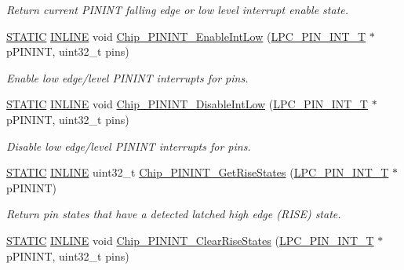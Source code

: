 \begin{DoxyCompactItemize}
\begin{DoxyCompactList}\small\item\em Return current P\+I\+N\+I\+NT falling edge or low level interrupt enable state. \end{DoxyCompactList}\item 
\hyperlink{group___l_p_c___types___public___macros_ga10b2d890d871e1489bb02b7e70d9bdfb}{S\+T\+A\+T\+IC} \hyperlink{spifi__18xx__43xx_8h_a2eb6f9e0395b47b8d5e3eeae4fe0c116}{I\+N\+L\+I\+NE} void \hyperlink{group___p_i_n_i_n_t__18_x_x__43_x_x_ga314265e0674903dee85767e974b77b7d}{Chip\+\_\+\+P\+I\+N\+I\+N\+T\+\_\+\+Enable\+Int\+Low} (\hyperlink{struct_l_p_c___p_i_n___i_n_t___t}{L\+P\+C\+\_\+\+P\+I\+N\+\_\+\+I\+N\+T\+\_\+T} $\ast$p\+P\+I\+N\+I\+NT, uint32\+\_\+t pins)
\begin{DoxyCompactList}\small\item\em Enable low edge/level P\+I\+N\+I\+NT interrupts for pins. \end{DoxyCompactList}\item 
\hyperlink{group___l_p_c___types___public___macros_ga10b2d890d871e1489bb02b7e70d9bdfb}{S\+T\+A\+T\+IC} \hyperlink{spifi__18xx__43xx_8h_a2eb6f9e0395b47b8d5e3eeae4fe0c116}{I\+N\+L\+I\+NE} void \hyperlink{group___p_i_n_i_n_t__18_x_x__43_x_x_gaaf5ace298255f4720f545b39c1053389}{Chip\+\_\+\+P\+I\+N\+I\+N\+T\+\_\+\+Disable\+Int\+Low} (\hyperlink{struct_l_p_c___p_i_n___i_n_t___t}{L\+P\+C\+\_\+\+P\+I\+N\+\_\+\+I\+N\+T\+\_\+T} $\ast$p\+P\+I\+N\+I\+NT, uint32\+\_\+t pins)
\begin{DoxyCompactList}\small\item\em Disable low edge/level P\+I\+N\+I\+NT interrupts for pins. \end{DoxyCompactList}\item 
\hyperlink{group___l_p_c___types___public___macros_ga10b2d890d871e1489bb02b7e70d9bdfb}{S\+T\+A\+T\+IC} \hyperlink{spifi__18xx__43xx_8h_a2eb6f9e0395b47b8d5e3eeae4fe0c116}{I\+N\+L\+I\+NE} uint32\+\_\+t \hyperlink{group___p_i_n_i_n_t__18_x_x__43_x_x_ga41e14d3b9450d31efea7c1c35081426b}{Chip\+\_\+\+P\+I\+N\+I\+N\+T\+\_\+\+Get\+Rise\+States} (\hyperlink{struct_l_p_c___p_i_n___i_n_t___t}{L\+P\+C\+\_\+\+P\+I\+N\+\_\+\+I\+N\+T\+\_\+T} $\ast$p\+P\+I\+N\+I\+NT)
\begin{DoxyCompactList}\small\item\em Return pin states that have a detected latched high edge (R\+I\+SE) state. \end{DoxyCompactList}\item 
\hyperlink{group___l_p_c___types___public___macros_ga10b2d890d871e1489bb02b7e70d9bdfb}{S\+T\+A\+T\+IC} \hyperlink{spifi__18xx__43xx_8h_a2eb6f9e0395b47b8d5e3eeae4fe0c116}{I\+N\+L\+I\+NE} void \hyperlink{group___p_i_n_i_n_t__18_x_x__43_x_x_ga66b7cbb3ab402c14cd89602820211f67}{Chip\+\_\+\+P\+I\+N\+I\+N\+T\+\_\+\+Clear\+Rise\+States} (\hyperlink{struct_l_p_c___p_i_n___i_n_t___t}{L\+P\+C\+\_\+\+P\+I\+N\+\_\+\+I\+N\+T\+\_\+T} $\ast$p\+P\+I\+N\+I\+NT, uint32\+\_\+t pins)

\end{DoxyCompactItemize}
